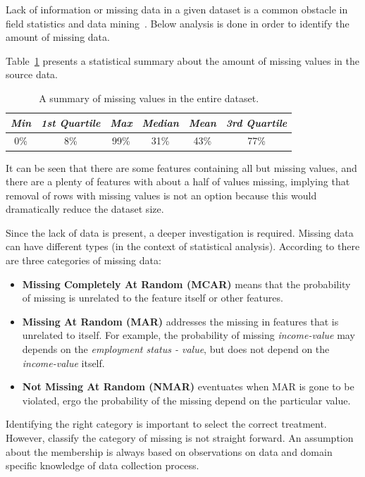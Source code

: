 Lack of information or missing data in a given dataset is a common obstacle in field statistics and data mining~\cite{Allison:2007}. Below analysis is done in order to identify the amount of missing data. 

Table~\ref{tab:missings-over-all} presents a statistical summary about the amount of missing values in the source data.
 \begin{table}[ht!]
  \begin{center}
    \caption{A summary of missing values in the entire dataset.}
    \label{tab:missings-over-all}
    \begin{tabular}{|c|c|c|c|c|c|}\hline
    \textit{Min} & \textit{1st Quartile} & \textit{Max} & \textit{Median} & \textit{Mean} & \textit{3rd Quartile} \\
      \hline
     0\% & 8\% & 99\% & 31\% & 43\% & 77\% \\ 
     \hline 
    \end{tabular}
  \end{center}
\end{table}
It can be seen that there are some features containing all but missing values, and there are a plenty of features with about a half of values missing, implying that removal of rows with missing values is not an option because this would dramatically reduce the dataset size.

Since the lack of data is present, a deeper investigation is required. Missing data can have different types (in the context of statistical analysis). According to \cite{Allison:2007} there are three categories of missing data:

 \begin{itemize}
    \item \textbf{Missing Completely At Random (MCAR)} means that the probability of missing is unrelated to the feature itself or other features. 
    \item \textbf{Missing At Random (MAR)} addresses the missing in features that is unrelated to itself. For example, the probability of missing \textit{income-value} may depends on the \textit{employment status - value}, but does not depend on the \textit{income-value} itself.
    \item \textbf{Not Missing At Random (NMAR)} eventuates when MAR is gone to be violated, ergo the probability of the missing depend on the particular value.
 \end{itemize}

Identifying the right category is important to select the correct treatment. However, classify the category of missing is not straight forward. An assumption about the membership is always based on observations on data and domain specific knowledge of data collection process.

